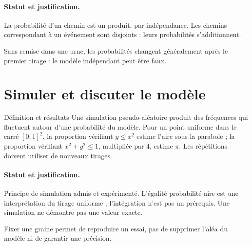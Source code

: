 \paragraph{Statut et justification.} La probabilité d’un chemin est un produit, par indépendance. Les chemins correspondant à un événement sont disjoints : leurs probabilités s’additionnent.
\label{C05-EX4}
\begin{erreur}Sans remise dans une urne, les probabilités changent généralement après le premier tirage : le modèle indépendant peut être faux.\end{erreur}
\label{C05-AP4}
\section{Simuler et discuter le modèle}\label{C05-U5}
\begin{repere}{Définition et résultats}
Une simulation pseudo-aléatoire produit des fréquences qui fluctuent autour d’une probabilité du modèle. Pour un point uniforme dans le carré $[0;1]^2$, la proportion vérifiant $y\leq x^2$ estime l’aire sous la parabole ; la proportion vérifiant $x^2+y^2\leq1$, multipliée par 4, estime $\pi$. Les répétitions doivent utiliser de nouveaux tirages.
\end{repere}
\paragraph{Statut et justification.} Principe de simulation admis et expérimenté. L’égalité probabilité-aire est une interprétation du tirage uniforme ; l’intégration n’est pas un prérequis. Une simulation ne démontre pas une valeur exacte.
\label{C05-EX5}
\begin{erreur}Fixer une graine permet de reproduire un essai, pas de supprimer l’aléa du modèle ni de garantir une précision.\end{erreur}
\label{C05-AP5}
